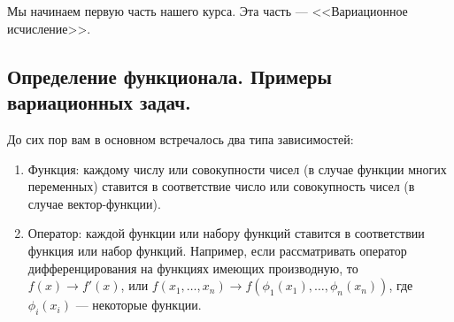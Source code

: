 \chapter{}
\label{lecture1}
Мы начинаем первую часть нашего курса. Эта часть --- <<Вариационное исчисление>>.
\section{Определение функционала. Примеры вариационных задач.}
\label{lecture1section1}
До сих пор вам в основном встречалось два типа зависимостей:
\begin{enumerate}
	\item Функция: каждому числу или совокупности чисел (в случае функции многих переменных) ставится в соответствие число или совокупность чисел (в случае вектор-функции).
	
	\item Оператор: каждой функции или набору функций ставится в соответствии функция или набор функций. Например, если рассматривать оператор дифференцирования на функциях имеющих производную, то $f(x)\to f'(x)$, или $f(x_1,\ldots,x_n)\to f(\phi_1(x_1),\ldots,\phi_n(x_n))$, где \\ $\phi_i(x_i)$ --- некоторые функции.
	
\end{enumerate}


